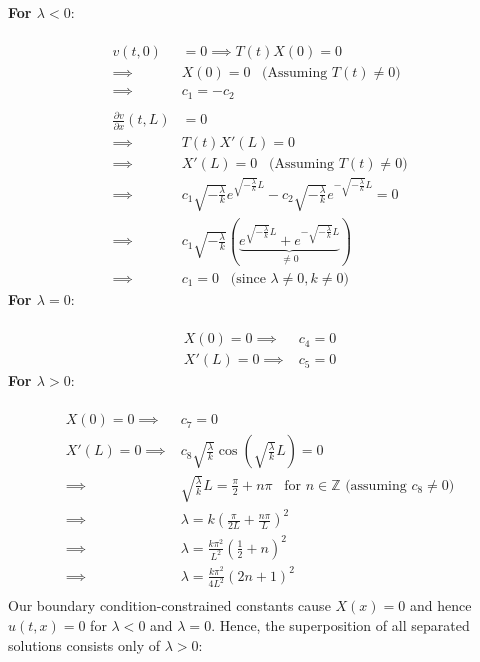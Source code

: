 \documentclass[12pt]{article}
\begin{document}
{\textbf{For $\lambda < 0$}: \\ \\
\begin{align*}
v(t,0)& = 0 \implies T(t)X(0) = 0  \\
\implies& X(0) = 0 \;\;\; \text{(Assuming $T(t) \neq 0$)} \\ 
\implies& \boxed{c_1 = -c_2} \\ \\
\frac{\partial v}{\partial x}(t,L) & = 0 \\
\implies& T(t)X'(L) = 0 \\
\implies& X'(L) = 0 \;\;\; \text{(Assuming $T(t) \neq 0$)} \\
\implies& c_1 \sqrt{-\frac{\lambda}{k}} e^{\sqrt{-\frac{\lambda}{k}} L} - c_2 \sqrt{-\frac{\lambda}{k}} e^{-\sqrt{-\frac{\lambda}{k}} L} = 0 \\ 
\implies&  c_1 \sqrt{-\frac{\lambda}{k}} \left( \underbrace{ e^{\sqrt{-\frac{\lambda}{k}} L} + e^{-\sqrt{-\frac{\lambda}{k}} L}}_{\neq 0}  \right) \\
\implies& \boxed{c_1 = 0} \;\;\; \text{(since $\lambda \neq 0, k \neq 0$)}
\end{align*}
\textbf{For $\lambda = 0$}: \\ \\
\begin{align*}
X(0) = 0 \implies& \boxed{c_4 = 0} \\
X'(L) = 0 \implies& \boxed{c_5 = 0}
\end{align*}
\textbf{For $\lambda > 0$}: \\ \\
\begin{align*}
X(0) = 0 \implies& \boxed{c_7 = 0} \\
X'(L) = 0 \implies& c_8 \sqrt{\frac{\lambda}{k}} \cos \left( \sqrt{\frac{\lambda}{k}} L \right) = 0 \\
\implies& \sqrt{\frac{\lambda}{k}} L = \frac{\pi}{2} + n\pi \;\;\; \text{for $n \in \mathbb{Z}$ (assuming $c_8 \neq 0$)} \\
\implies& \lambda = k \left( \frac{\pi}{2L} + \frac{n\pi}{L} \right)^2 \\ 
\implies& \lambda = \frac{k \pi^2}{L^2} \left( \frac{1}{2} + n \right)^2 \\ 
\implies& \lambda = \frac{k \pi^2}{4L^2} \left(2n + 1 \right)^2 \\ 
\end{align*}
Our boundary condition-constrained constants cause $X(x) = 0$ and hence $u(t,x) = 0$ for $\lambda < 0$ and $\lambda = 0$. Hence, the superposition of all separated solutions consists only of $\lambda > 0$: \\ \\ 
}
\end{document}
